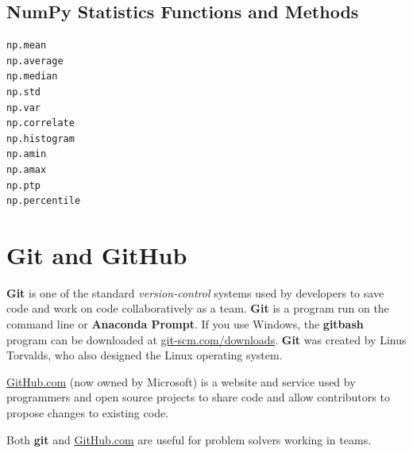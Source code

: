 \documentclass{book}
\newenvironment{key_terms}{\begin{multicols}{3}}{\end{multicols}} %
\begin{document}
    




    
        \subsection{NumPy Statistics Functions and
Methods}\label{numpy-statistics-functions-and-methods}
    




    
        \begin{key_terms}
        \begin{lstlisting}
np.mean
np.average
np.median
np.std
np.var
np.correlate
np.histogram
np.amin
np.amax
np.ptp
np.percentile
\end{lstlisting}
        \end{key_terms}

    




    
        \section{Git and GitHub}\label{git-and-github}
    




    
        \textbf{Git} is one of the standard \emph{version-control} systems used
by developers to save code and work on code collaboratively as a team.
\textbf{Git} is a program run on the command line or \textbf{Anaconda
Prompt}. If you use Windows, the \textbf{gitbash} program can be
downloaded at
\href{https://git-scm.com/downloads}{git-scm.com/downloads}.
\textbf{Git} was created by Linus Torvalds, who also designed the Linux
operating system.
    




    
        \href{https://github.com/}{GitHub.com} (now owned by Microsoft) is a
website and service used by programmers and open source projects to
share code and allow contributors to propose changes to existing code.
    




    
        Both \textbf{git} and \href{https://github.com/}{GitHub.com} are useful
for problem solvers working in teams.
    
\end{document}
